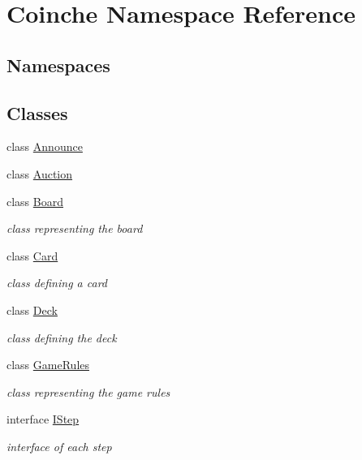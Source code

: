 \hypertarget{namespace_coinche}{}\section{Coinche Namespace Reference}
\label{namespace_coinche}
\subsection*{Namespaces}
\begin{DoxyCompactItemize}
\end{DoxyCompactItemize}
\subsection*{Classes}
\begin{DoxyCompactItemize}
\item 
class \hyperlink{class_coinche_1_1_announce}{Announce}
\item 
class \hyperlink{class_coinche_1_1_auction}{Auction}
\item 
class \hyperlink{class_coinche_1_1_board}{Board}
\begin{DoxyCompactList}\small\item\em class representing the board \end{DoxyCompactList}\item 
class \hyperlink{class_coinche_1_1_card}{Card}
\begin{DoxyCompactList}\small\item\em class defining a card \end{DoxyCompactList}\item 
class \hyperlink{class_coinche_1_1_deck}{Deck}
\begin{DoxyCompactList}\small\item\em class defining the deck \end{DoxyCompactList}\item 
class \hyperlink{class_coinche_1_1_game_rules}{Game\+Rules}
\begin{DoxyCompactList}\small\item\em class representing the game rules \end{DoxyCompactList}\item 
interface \hyperlink{interface_coinche_1_1_i_step}{I\+Step}
\begin{DoxyCompactList}\small\item\em interface of each step \end{DoxyCompactList}\item 

\end{DoxyCompactItemize}
